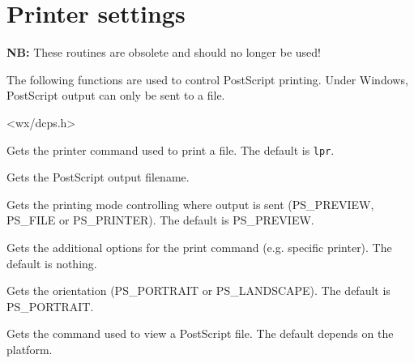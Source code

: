 \section{Printer settings}\label{printersettings}

{\bf NB:} These routines are obsolete and should no longer be used!

The following functions are used to control PostScript printing. Under
Windows, PostScript output can only be sent to a file.


<wx/dcps.h>

\label{wxgetprintercommand}


Gets the printer command used to print a file. The default is {\tt lpr}.

\label{wxgetprinterfile}


Gets the PostScript output filename.

\label{wxgetprintermode}


Gets the printing mode controlling where output is sent (PS\_PREVIEW, PS\_FILE or PS\_PRINTER).
The default is PS\_PREVIEW.

\label{wxgetprinteroptions}


Gets the additional options for the print command (e.g. specific printer). The default is nothing.

\label{wxgetprinterorientation}


Gets the orientation (PS\_PORTRAIT or PS\_LANDSCAPE). The default is PS\_PORTRAIT.

\label{wxgetprinterpreviewcommand}


Gets the command used to view a PostScript file. The default depends on the platform.

\label{wxgetprinterscaling}

